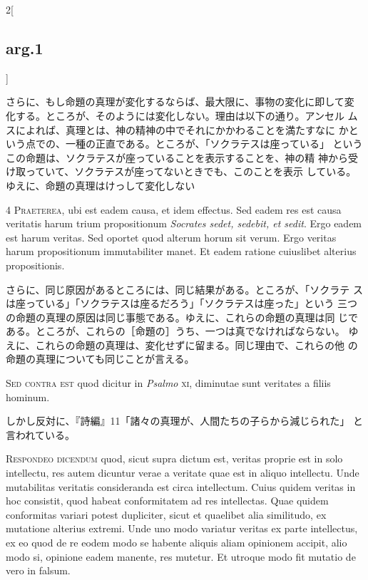\documentclass[paper=a4paper,fontsize=10pt,jafontsize=9pt,titlepage]{jlreq}
\begin{document}
\begin{paracol}{2}[\subsection{arg.1}]
\switchcolumn

さらに、もし命題の真理が変化するならば、最大限に、事物の変化に即して変
 化する。ところが、そのようには変化しない。理由は以下の通り。アンセル
 ムスによれば、真理とは、神の精神の中でそれにかかわることを満たすなに
 かという点での、一種の正直である。ところが、「ソクラテスは座っている」
 というこの命題は、ソクラテスが座っていることを表示することを、神の精
 神から受け取っていて、ソクラテスが座ってないときでも、このことを表示
 している。ゆえに、命題の真理はけっして変化しない



{\scshape 4 Praeterea}, ubi est eadem causa, et idem effectus. Sed
eadem res est causa veritatis harum trium propositionum {\itshape
Socrates sedet, sedebit, et sedit}. Ergo eadem est harum veritas. Sed
oportet quod alterum horum sit verum. Ergo veritas harum propositionum
immutabiliter manet. Et eadem ratione cuiuslibet alterius
propositionis.

\switchcolumn

さらに、同じ原因があるところには、同じ結果がある。ところが、「ソクラテ
スは座っている」「ソクラテスは座るだろう」「ソクラテスは座った」という
三つの命題の真理の原因は同じ事態である。ゆえに、これらの命題の真理は同
じである。ところが、これらの［命題の］うち、一つは真でなければならない。
ゆえに、これらの命題の真理は、変化せずに留まる。同じ理由で、これらの他
の命題の真理についても同じことが言える。

\switchcolumn*[\subsection{s.c.}]


{\scshape Sed contra est} quod dicitur in {\itshape Psalmo} {\scshape
xi}, diminutae sunt veritates a filiis hominum.

\switchcolumn

しかし反対に、『詩編』11「諸々の真理が、人間たちの子らから減じられた」
 と言われている。



{\scshape Respondeo dicendum} quod, sicut supra dictum est, veritas
proprie est in solo intellectu, res autem dicuntur verae a veritate
quae est in aliquo intellectu. Unde mutabilitas veritatis consideranda
est circa intellectum. Cuius quidem veritas in hoc consistit, quod
habeat conformitatem ad res intellectas. Quae quidem conformitas
variari potest dupliciter, sicut et quaelibet alia similitudo, ex
mutatione alterius extremi. Unde uno modo variatur veritas ex parte
intellectus, ex eo quod de re eodem modo se habente aliquis aliam
opinionem accipit, alio modo si, opinione eadem manente, res
mutetur. Et utroque modo fit mutatio de vero in falsum.


\end{paracol}
\end{document}
